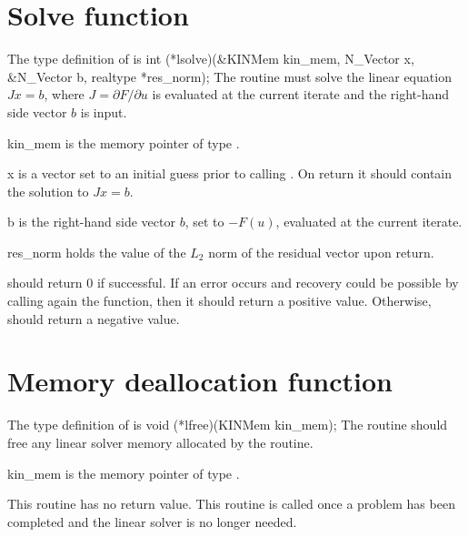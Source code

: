 \section{Solve function}
The type definition of  is
{
  int (*lsolve)(&KINMem kin\_mem, N\_Vector x, \\
                &N\_Vector b, realtype *res\_norm);
}
{
  The routine  must solve the linear equation $J x = b$, where         
  $J = \partial F / \partial u$ is evaluated at the current iterate
  and the right-hand side vector $b$ is input. 
}
{
  \begin{args}
  \item[kin\_mem]
    is the {\kinsol} memory pointer of type .
  \item[x]
    is a vector set to an initial guess prior to calling . 
    On return it should contain the solution to $J x = b$.
  \item[b]
    is the right-hand side vector $b$, set to $-F(u)$, evaluated at
    the current iterate.
  \item[res\_norm]
    holds the value of the $L_2$ norm of the residual vector upon return.
  \end{args}
}
{
   should return $0$ if successful.
  If an error occurs and recovery could be possible by calling again
  the  function, then it should return a positive value.
  Otherwise,  should return a negative value.
}
{}


\section{Memory deallocation function}
The type definition of  is
{
  void (*lfree)(KINMem kin\_mem);
}
{
  The routine  should free any linear solver memory
  allocated by the  routine.
}
{
  \begin{args}
  \item[kin\_mem]
    is the {\kinsol} memory pointer of type .
  \end{args}
}
{
  This routine has no return value.
}
{
  This routine is called once a problem has been completed and the 
  linear solver is no longer needed.
}
